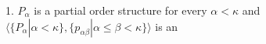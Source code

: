 1. $P_\alpha$ is a partial order structure for every $\alpha < \kappa$ and $\langle \{P_\alpha | \alpha < \kappa\}, \{p_{\alpha\beta} | \alpha \leq \beta < \kappa\} \rangle$ is an

